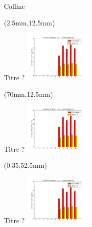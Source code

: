 \documentclass[10pt]{beamer}
\begin{document}
	\begin{frame}{Colline}
		\begin{textblock*}{60mm}(2.5mm,12.5mm)
			\begin{block}{Titre ?}
				\includegraphics[width=125px]{../src/data/itinary_4/var_ecart_sat_x.png}
			\end{block}
		\end{textblock*}

		\begin{textblock*}{60mm}(70mm,12.5mm)
			\begin{block}{Titre ?}
				\includegraphics[width=125px]{../src/data/itinary_4/var_ecart_sat_x.png}
			\end{block}
		\end{textblock*}

		\begin{textblock*}{60mm}(0.35\textwidth,52.5mm)
			\begin{block}{Titre ?}
				\includegraphics[width=125px]{../src/data/itinary_4/var_ecart_sat_x.png}
			\end{block}
		\end{textblock*}
	\end{frame}
\end{document}
